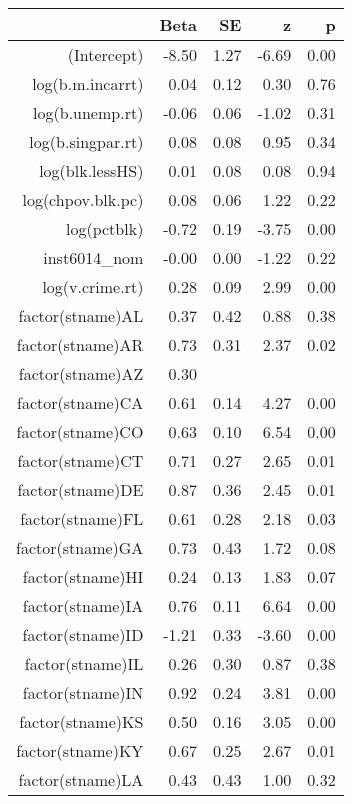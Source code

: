 \begin{table}[ht]
\centering
\begin{tabular}{rrrrr}
  \hline
 & Beta & SE & z & p \\ 
  \hline
(Intercept) & -8.50 & 1.27 & -6.69 & 0.00 \\ 
  log(b.m.incarrt) & 0.04 & 0.12 & 0.30 & 0.76 \\ 
  log(b.unemp.rt) & -0.06 & 0.06 & -1.02 & 0.31 \\ 
  log(b.singpar.rt) & 0.08 & 0.08 & 0.95 & 0.34 \\ 
  log(blk.lessHS) & 0.01 & 0.08 & 0.08 & 0.94 \\ 
  log(chpov.blk.pc) & 0.08 & 0.06 & 1.22 & 0.22 \\ 
  log(pctblk) & -0.72 & 0.19 & -3.75 & 0.00 \\ 
  inst6014\_nom & -0.00 & 0.00 & -1.22 & 0.22 \\ 
  log(v.crime.rt) & 0.28 & 0.09 & 2.99 & 0.00 \\ 
  factor(stname)AL & 0.37 & 0.42 & 0.88 & 0.38 \\ 
  factor(stname)AR & 0.73 & 0.31 & 2.37 & 0.02 \\ 
  factor(stname)AZ & 0.30 &  &  &  \\ 
  factor(stname)CA & 0.61 & 0.14 & 4.27 & 0.00 \\ 
  factor(stname)CO & 0.63 & 0.10 & 6.54 & 0.00 \\ 
  factor(stname)CT & 0.71 & 0.27 & 2.65 & 0.01 \\ 
  factor(stname)DE & 0.87 & 0.36 & 2.45 & 0.01 \\ 
  factor(stname)FL & 0.61 & 0.28 & 2.18 & 0.03 \\ 
  factor(stname)GA & 0.73 & 0.43 & 1.72 & 0.08 \\ 
  factor(stname)HI & 0.24 & 0.13 & 1.83 & 0.07 \\ 
  factor(stname)IA & 0.76 & 0.11 & 6.64 & 0.00 \\ 
  factor(stname)ID & -1.21 & 0.33 & -3.60 & 0.00 \\ 
  factor(stname)IL & 0.26 & 0.30 & 0.87 & 0.38 \\ 
  factor(stname)IN & 0.92 & 0.24 & 3.81 & 0.00 \\ 
  factor(stname)KS & 0.50 & 0.16 & 3.05 & 0.00 \\ 
  factor(stname)KY & 0.67 & 0.25 & 2.67 & 0.01 \\ 
  factor(stname)LA & 0.43 & 0.43 & 1.00 & 0.32 \\ 

\end{tabular}
\end{table}

